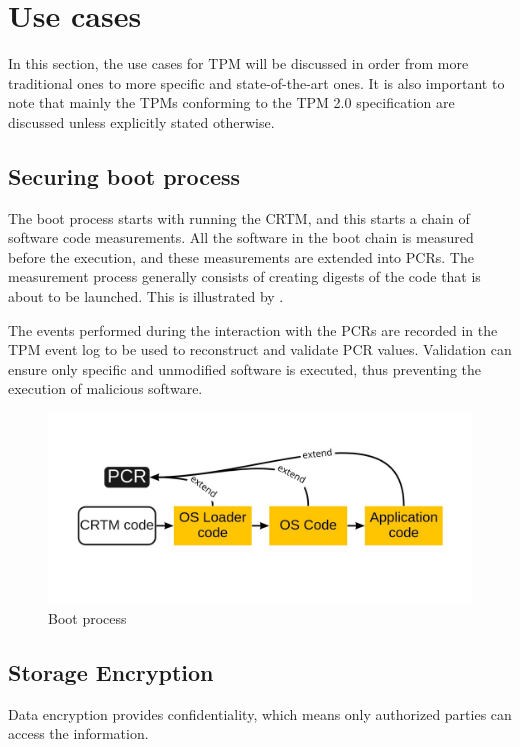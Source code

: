 \section{Use cases}
In this section, the use cases for TPM will be discussed in order from more traditional ones to more specific and state-of-the-art ones. It is also important to note that mainly the TPMs conforming to the TPM 2.0 specification are discussed unless explicitly stated otherwise.

\subsection{Securing boot process}
The boot process starts with running the CRTM, and this starts a chain of software code measurements. All the software in the boot chain is measured before the execution, and these measurements are extended into PCRs. The measurement process generally consists of creating digests of the code that is about to be launched. This is illustrated by . 

The events performed during the interaction with the PCRs are recorded in the TPM event log \cite{tcg_tpm2_pcspec} to be used to reconstruct and validate PCR values. Validation can ensure only specific and unmodified software is executed, thus preventing the execution of malicious software.

\begin{figure}[H]
    \centering
    \includegraphics[width=\textwidth]{img/boot.jpg}
    \caption{Boot process}
    \label{fig:boot}
\end{figure}

\subsection{Storage Encryption}
Data encryption provides confidentiality, which means only authorized parties can access the information. 

